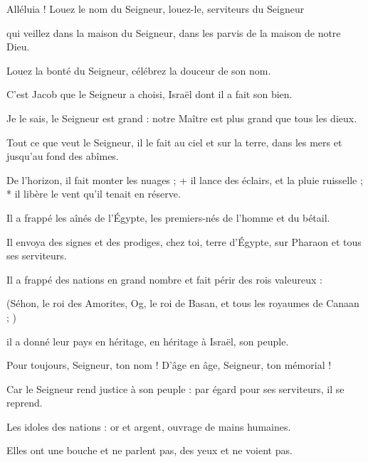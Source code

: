 \item Alléluia ! Louez le nom du Seigneur, louez-le, serviteurs du Seigneur

\item qui veillez dans la maison du Seigneur, dans les parvis de la maison de notre Dieu.

\item Louez la bonté du Seigneur, célébrez la douceur de son nom.

\item C'est Jacob que le Seigneur a choisi, Israël dont il a fait son bien.

\item Je le sais, le Seigneur est grand : notre Maître est plus grand que tous les dieux.

\item Tout ce que veut le Seigneur, il le fait au ciel et sur la terre, dans les mers et jusqu'au fond des abîmes.

\item De l'horizon, il fait monter les nuages ; + il lance des éclairs, et la pluie ruisselle ; * il libère le vent qu'il tenait en réserve.

\item Il a frappé les aînés de l'Égypte, les premiers-nés de l'homme et du bétail.

\item Il envoya des signes et des prodiges, chez toi, terre d'Égypte, sur Pharaon et tous ses serviteurs.

\item Il a frappé des nations en grand nombre et fait périr des rois valeureux :

\item (Séhon, le roi des Amorites, Og, le roi de Basan, et tous les royaumes de Canaan ; )

\item il a donné leur pays en héritage, en héritage à Israël, son peuple.

\item Pour toujours, Seigneur, ton nom ! D'âge en âge, Seigneur, ton mémorial !

\item Car le Seigneur rend justice à son peuple : par égard pour ses serviteurs, il se reprend.

\item Les idoles des nations : or et argent, ouvrage de mains humaines.

\item Elles ont une bouche et ne parlent pas, des yeux et ne voient pas.

